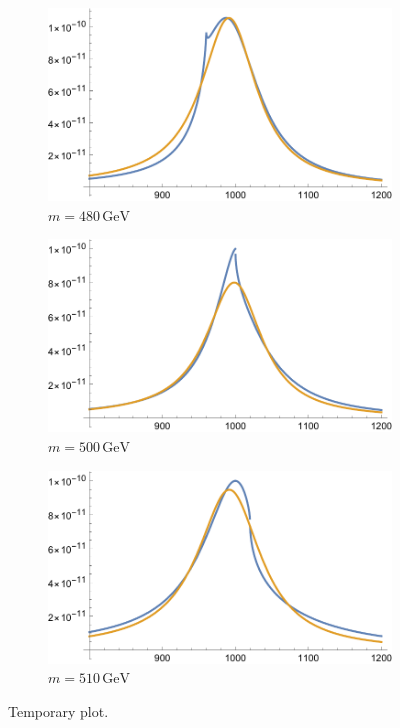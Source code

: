 \documentclass[11pt]{article}
\theoremstyle{definition}
\theoremstyle{remark}
\begin{document}
	\begin{figure}[h]
		\centering
		\begin{subfigure}{0.3\textwidth}
			\centering
			\includegraphics[width=0.9\linewidth]{temp_a.pdf}
			\caption{$m=480\,\mathrm{GeV}$}
			\label{fig:temp:a}
		\end{subfigure}
		\begin{subfigure}{0.3\textwidth}
			\centering
			\includegraphics[width=0.9\linewidth]{temp_b.pdf}
			\caption{$m=500\,\mathrm{GeV}$}
			\label{fig:temp:b}
		\end{subfigure}
		\begin{subfigure}{0.3\textwidth}
			\centering
			\includegraphics[width=0.9\linewidth]{temp_c.pdf}
			\caption{$m=510\,\mathrm{GeV}$}
			\label{fig:temp:c}
		\end{subfigure}
		\captionsetup{width=.9\linewidth}
		\caption{Temporary plot.}
		\label{fig:temp}
	\end{figure}
	
\end{document}
